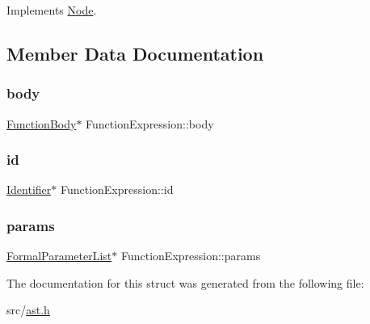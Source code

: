 Implements \hyperlink{struct_node_a82f29420d0a38efcc370352528e94e9b}{Node}.



\subsection{Member Data Documentation}
\mbox{\label{struct_function_expression_af08f7dfdb616e122ab79c9a2e706061e}} 
\subsubsection{\texorpdfstring{body}{body}}
{\footnotesize\ttfamily \hyperlink{struct_function_body}{Function\+Body}$\ast$ Function\+Expression\+::body}

\mbox{\label{struct_function_expression_a448321d33ff9d2603dfdb0b14cf4fe24}} 
\subsubsection{\texorpdfstring{id}{id}}
{\footnotesize\ttfamily \hyperlink{struct_identifier}{Identifier}$\ast$ Function\+Expression\+::id}

\mbox{\label{struct_function_expression_a5d02f2d692ae86ebdc36a3963042af65}} 
\subsubsection{\texorpdfstring{params}{params}}
{\footnotesize\ttfamily \hyperlink{struct_formal_parameter_list}{Formal\+Parameter\+List}$\ast$ Function\+Expression\+::params}



The documentation for this struct was generated from the following file\+:\begin{DoxyCompactItemize}
\item 
src/\hyperlink{ast_8h}{ast.\+h}\end{DoxyCompactItemize}
